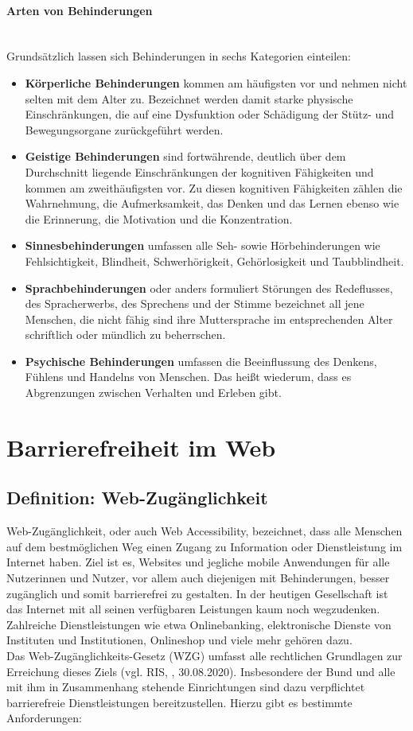 \paragraph{Arten von Behinderungen}\mbox{}\\
Grundsätzlich lassen sich Behinderungen in sechs Kategorien einteilen:

\begin{itemize}
    \item \textbf{Körperliche Behinderungen} kommen am häufigsten vor und nehmen nicht selten mit dem Alter zu. Bezeichnet werden damit starke physische Einschränkungen, die auf eine Dysfunktion oder Schädigung der Stütz- und Bewegungsorgane zurückgeführt werden.
    \item \textbf{Geistige Behinderungen} sind fortwährende, deutlich über dem Durchschnitt liegende Einschränkungen der kognitiven Fähigkeiten und kommen am zweithäufigsten vor. Zu diesen kognitiven Fähigkeiten zählen die Wahrnehmung, die Aufmerksamkeit, das Denken und das Lernen ebenso wie die Erinnerung, die Motivation und die Konzentration.
    \item \textbf{Sinnesbehinderungen} umfassen alle Seh- sowie Hörbehinderungen wie Fehlsichtigkeit, Blindheit, Schwerhörigkeit, Gehörlosigkeit und Taubblindheit.
    \item \textbf{Sprachbehinderungen} oder anders formuliert Störungen des Redeflusses, des Spracherwerbs, des Sprechens und der Stimme bezeichnet all jene Menschen, die nicht fähig sind ihre Muttersprache im entsprechenden Alter schriftlich oder mündlich zu beherrschen.
    \item \textbf{Psychische Behinderungen} umfassen die Beeinflussung des Denkens, Fühlens und Handelns von Menschen. Das heißt wiederum, dass es Abgrenzungen zwischen Verhalten und Erleben gibt.
\end{itemize}

\section{Barrierefreiheit im Web}
\subsection{Definition: Web-Zugänglichkeit}
Web-Zugänglichkeit, oder auch Web Accessibility, bezeichnet, dass alle Menschen auf dem bestmöglichen Weg einen Zugang zu Information oder Dienstleistung im Internet haben. Ziel ist es, Websites und jegliche mobile Anwendungen für alle Nutzerinnen und Nutzer, vor allem auch diejenigen mit Behinderungen, besser zugänglich und somit barrierefrei zu gestalten. In der heutigen Gesellschaft ist das Internet mit all seinen verfügbaren Leistungen kaum noch wegzudenken. Zahlreiche Dienstleistungen wie etwa Onlinebanking, elektronische Dienste von Instituten und Institutionen, Onlineshop und viele mehr gehören dazu.\\
Das Web-Zugänglichkeits-Gesetz (WZG) umfasst alle rechtlichen Grundlagen zur Erreichung dieses Ziels (vgl. RIS, \cite{ris_wzg_2020}, 30.08.2020). Insbesondere der Bund und alle mit ihm in Zusammenhang stehende Einrichtungen sind dazu verpflichtet barrierefreie Dienstleistungen bereitzustellen. Hierzu gibt es bestimmte Anforderungen:

